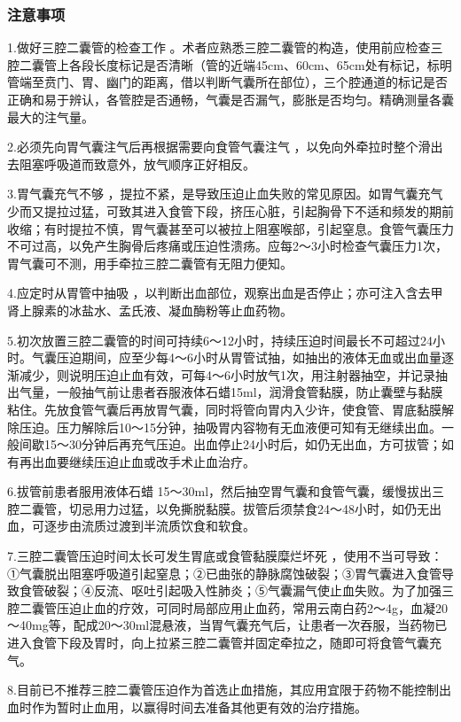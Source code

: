 \subsubsection{注意事项}

1.做好三腔二囊管的检查工作
。术者应熟悉三腔二囊管的构造，使用前应检查三腔二囊管上各段长度标记是否清晰（管的近端45cm、60cm、65cm处有标记，标明管端至贲门、胃、幽门的距离，借以判断气囊所在部位），三个腔通道的标记是否正确和易于辨认，各管腔是否通畅，气囊是否漏气，膨胀是否均匀。精确测量各囊最大的注气量。

2.必须先向胃气囊注气后再根据需要向食管气囊注气
，以免向外牵拉时整个滑出去阻塞呼吸道而致意外，放气顺序正好相反。

3.胃气囊充气不够
，提拉不紧，是导致压迫止血失败的常见原因。如胃气囊充气少而又提拉过猛，可致其进入食管下段，挤压心脏，引起胸骨下不适和频发的期前收缩；有时提拉不慎，胃气囊甚至可以被拉上阻塞喉部，引起窒息。食管气囊压力不可过高，以免产生胸骨后疼痛或压迫性溃疡。应每2～3小时检查气囊压力1次，胃气囊可不测，用手牵拉三腔二囊管有无阻力便知。

4.应定时从胃管中抽吸
，以判断出血部位，观察出血是否停止；亦可注入含去甲肾上腺素的冰盐水、孟氏液、凝血酶粉等止血药物。

5.初次放置三腔二囊管的时间可持续6～12小时，持续压迫时间最长不可超过24小时。气囊压迫期间，应至少每4～6小时从胃管试抽，如抽出的液体无血或出血量逐渐减少，则说明压迫止血有效，可每4～6小时放气1次，用注射器抽空，并记录抽出气量，一般抽气前让患者吞服液体石蜡15ml，润滑食管黏膜，防止囊壁与黏膜粘住。先放食管气囊后再放胃气囊，同时将管向胃内入少许，使食管、胃底黏膜解除压迫。压力解除后10～15分钟，抽吸胃内容物有无血液便可知有无继续出血。一般间歇15～30分钟后再充气压迫。出血停止24小时后，如仍无出血，方可拔管；如有再出血要继续压迫止血或改手术止血治疗。

6.拔管前患者服用液体石蜡
15～30ml，然后抽空胃气囊和食管气囊，缓慢拔出三腔二囊管，切忌用力过猛，以免撕脱黏膜。拔管后须禁食24～48小时，如仍无出血，可逐步由流质过渡到半流质饮食和软食。

7.三腔二囊管压迫时间太长可发生胃底或食管黏膜糜烂坏死
，使用不当可导致：①气囊脱出阻塞呼吸道引起窒息；②已曲张的静脉腐蚀破裂；③胃气囊进入食管导致食管破裂；④反流、呕吐引起吸入性肺炎；⑤气囊漏气使止血失败。为了加强三腔二囊管压迫止血的疗效，可同时局部应用止血药，常用云南白药2～4g，血凝20～40mg等，配成20～30ml混悬液，当胃气囊充气后，让患者一次吞服，当药物已进入食管下段及胃时，向上拉紧三腔二囊管并固定牵拉之，随即可将食管气囊充气。

8.目前已不推荐三腔二囊管压迫作为首选止血措施，其应用宜限于药物不能控制出血时作为暂时止血用，以赢得时间去准备其他更有效的治疗措施。


